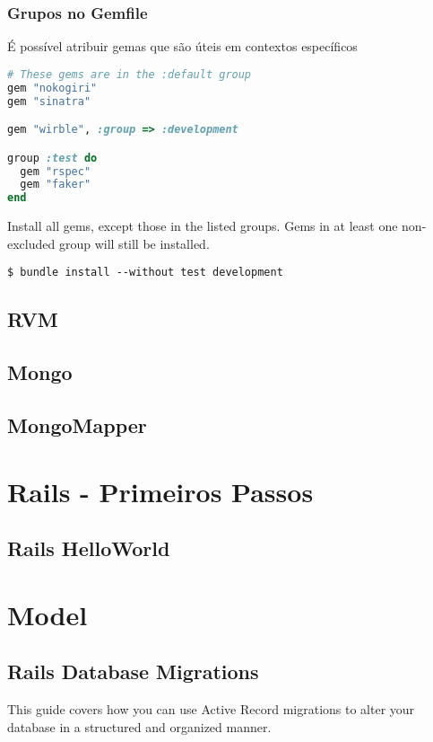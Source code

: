 \documentclass[serif,mathserif]{article}
\begin{document}
\subsubsection{Grupos no Gemfile}
É possível atribuir gemas que são úteis em contextos específicos
\begin{lstlisting}[language=ruby]
# These gems are in the :default group
gem "nokogiri"
gem "sinatra"

gem "wirble", :group => :development

group :test do
  gem "rspec"
  gem "faker"
end
\end{lstlisting}
  
Install all gems, except those in the listed groups. Gems in at least one non-excluded group will still be installed.
\begin{verbatim}
$ bundle install --without test development
\end{verbatim}

\subsection{RVM}
 
\subsection{Mongo}

\subsection{MongoMapper}

\section{Rails - Primeiros Passos}

\subsection{Rails HelloWorld}

\section{Model}

\subsection{Rails Database Migrations}
This guide covers how you can use Active Record migrations to alter your database in a structured and organized manner.
\end{document}
